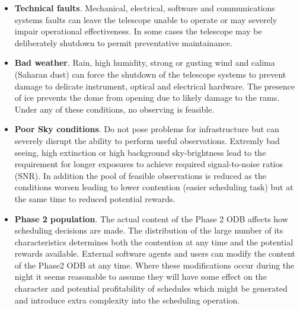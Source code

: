 \begin{itemize}

\item {\bf Technical faults}. Mechanical, electrical, software and communications systems faults can leave the telescope unable to operate or may severely impair operational effectiveness. In some cases the telescope may be deliberately shutdown to permit preventative maintainance.

\item {\bf Bad weather}. Rain, high humidity, strong or gusting wind and calima (Saharan dust) can force the shutdown of the telescope systems to prevent damage to delicate instrument, optical and electrical hardware. The presence of ice prevents the dome from opening due to likely damage to the rams. Under any of these conditions, no observing is feasible. 


\item {\bf Poor Sky conditions}. Do not pose problems for infrastructure but can severely disrupt the ability to perform useful observations. Extremly bad seeing, high extinction or high background sky-brightness lead to the requirement for longer exposures to achieve required signal-to-noise ratios (SNR). In addition the pool of feasible observations is reduced as the conditions worsen leading to lower contention (easier scheduling task) but at the same time to reduced potential rewards.

\item {\bf Phase 2 population}. The actual content of the Phase 2 ODB affects how scheduling decisions are made. The distribution of the large number of its characteristics determines both the contention at any time and the potential rewards available. External software agents and users can modify the content of the Phase2 ODB at any time. Where these modifications occur during the night it seems reasonable to assume they will have some effect on the character and potential profitability of schedules which might be generated and introduce extra complexity into the scheduling operation.

\end{itemize}
  
